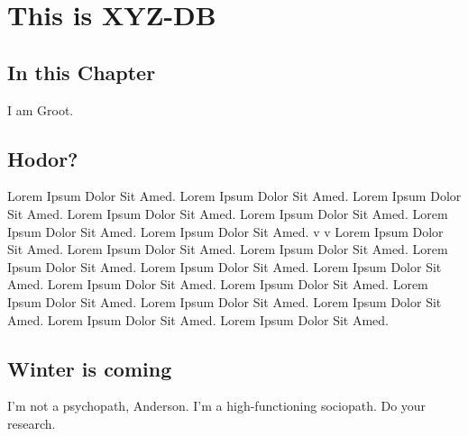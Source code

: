 \chapter{This is XYZ-DB}
\section{In this Chapter }
I am Groot.
\section{Hodor?}
Lorem Ipsum Dolor Sit Amed. Lorem Ipsum Dolor Sit Amed. Lorem Ipsum Dolor Sit Amed. Lorem Ipsum Dolor Sit Amed. Lorem Ipsum Dolor Sit Amed. Lorem Ipsum Dolor Sit Amed. Lorem Ipsum Dolor Sit Amed. v v Lorem Ipsum Dolor Sit Amed. Lorem Ipsum Dolor Sit Amed. Lorem Ipsum Dolor Sit Amed. Lorem Ipsum Dolor Sit Amed. Lorem Ipsum Dolor Sit Amed. Lorem Ipsum Dolor Sit Amed. Lorem Ipsum Dolor Sit Amed. Lorem Ipsum Dolor Sit Amed. Lorem Ipsum Dolor Sit Amed. Lorem Ipsum Dolor Sit Amed. Lorem Ipsum Dolor Sit Amed. Lorem Ipsum Dolor Sit Amed. Lorem Ipsum Dolor Sit Amed. 
\section{Winter is coming}
I’m not a psychopath, Anderson. I’m a high-functioning sociopath. Do your research.